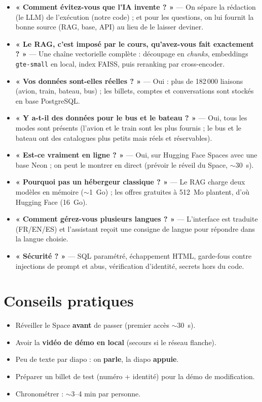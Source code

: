 \documentclass[11pt,a4paper]{article}
\newcommand{\code}[1]{\texttt{\small #1}}
\begin{document}
\begin{itemize}[leftmargin=1.2em]
  \item \textbf{« Comment évitez-vous que l'IA invente ? »} --- On sépare la rédaction
        (le LLM) de l'exécution (notre code) ; et pour les questions, on lui fournit la
        bonne source (RAG, base, API) au lieu de le laisser deviner.
  \item \textbf{« Le RAG, c'est imposé par le cours, qu'avez-vous fait exactement ? »} ---
        Une chaîne vectorielle complète : découpage en \emph{chunks}, embeddings
        \code{gte-small} en local, index FAISS, puis reranking par cross-encoder.
  \item \textbf{« Vos données sont-elles réelles ? »} --- Oui : plus de 182\,000 liaisons
        (avion, train, bateau, bus) ; les billets, comptes et conversations sont stockés
        en base PostgreSQL.
  \item \textbf{« Y a-t-il des données pour le bus et le bateau ? »} --- Oui, tous les
        modes sont présents (l'avion et le train sont les plus fournis ; le bus et le
        bateau ont des catalogues plus petits mais réels et réservables).
  \item \textbf{« Est-ce vraiment en ligne ? »} --- Oui, sur Hugging Face Spaces avec une
        base Neon ; on peut le montrer en direct (prévoir le réveil du Space, $\sim$30~s).
  \item \textbf{« Pourquoi pas un hébergeur classique ? »} --- Le RAG charge deux modèles
        en mémoire ($\sim$1~Go) ; les offres gratuites à 512~Mo plantent, d'où Hugging
        Face (16~Go).
  \item \textbf{« Comment gérez-vous plusieurs langues ? »} --- L'interface est traduite
        (FR/EN/ES) et l'assistant reçoit une consigne de langue pour répondre dans la
        langue choisie.
  \item \textbf{« Sécurité ? »} --- SQL paramétré, échappement HTML, garde-fous contre
        injections de prompt et abus, vérification d'identité, secrets hors du code.
\end{itemize}

\section{Conseils pratiques}
\begin{itemize}[nosep]
  \item Réveiller le Space \textbf{avant} de passer (premier accès $\sim$30~s).
  \item Avoir la \textbf{vidéo de démo en local} (secours si le réseau flanche).
  \item Peu de texte par diapo : on \textbf{parle}, la diapo \textbf{appuie}.
  \item Préparer un billet de test (numéro + identité) pour la démo de modification.
  \item Chronométrer : $\sim$3--4 min par personne.
\end{itemize}
\end{document}
